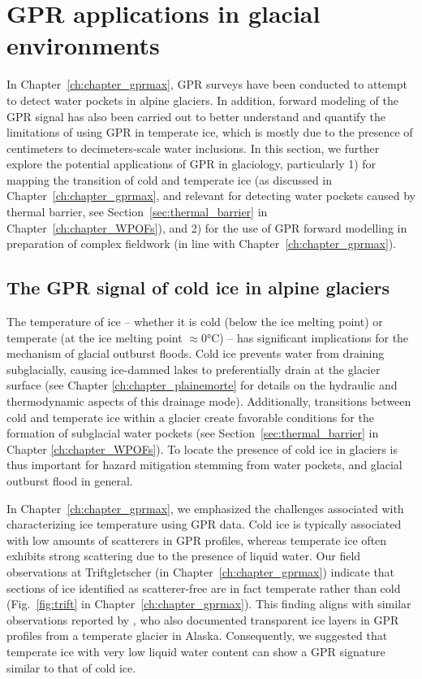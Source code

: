 \section{GPR applications in glacial environments}

In Chapter~\ref{ch:chapter_gprmax}, GPR surveys have been conducted to attempt to detect water pockets in alpine glaciers. In addition, forward modeling of the GPR signal has also been carried out to better understand and quantify the limitations of using GPR in temperate ice, which is mostly due to the presence of centimeters to decimeters-scale water inclusions. In this section, we further explore the potential applications of GPR in glaciology, particularly 1) for mapping the transition of cold and temperate ice (as discussed in Chapter~\ref{ch:chapter_gprmax}, and relevant for detecting water pockets caused by thermal barrier, see Section~\ref{sec:thermal_barrier} in Chapter~\ref{ch:chapter_WPOFs}), and 2) for the use of GPR forward modelling in preparation of complex fieldwork (in line with Chapter~\ref{ch:chapter_gprmax}).


\subsection{The GPR signal of cold ice in alpine glaciers}


The temperature of ice -- whether it is cold (below the ice melting point) or temperate (at the ice melting point $\approx$0°C) -- has significant implications for the mechanism of glacial outburst floods. Cold ice prevents water from draining subglacially, causing ice-dammed lakes to preferentially drain at the glacier surface (see Chapter \ref{ch:chapter_plainemorte} for details on the hydraulic and thermodynamic aspects of this drainage mode). Additionally, transitions between cold and temperate ice within a glacier create favorable conditions for the formation of subglacial water pockets (see Section~\ref{sec:thermal_barrier} in Chapter \ref{ch:chapter_WPOFs}). To locate the presence of cold ice in glaciers is thus important for hazard mitigation stemming from water pockets, and glacial outburst flood in general. 

In Chapter~\ref{ch:chapter_gprmax}, we emphasized the challenges associated with characterizing ice temperature using GPR data. Cold ice is typically associated with low amounts of scatterers in GPR profiles, whereas temperate ice often exhibits strong scattering due to the presence of liquid water. Our field observations at Triftgletscher (in Chapter~\ref{ch:chapter_gprmax}) indicate that sections of ice identified as scatterer-free are in fact temperate rather than cold (Fig.~\ref{fig:trift} in Chapter~\ref{ch:chapter_gprmax}). This finding aligns with similar observations reported by \cite{Brown&al2009}, who also documented transparent ice layers in GPR profiles from a temperate glacier in Alaska. Consequently, we suggested that temperate ice with very low liquid water content can show a GPR signature similar to that of cold ice. 

